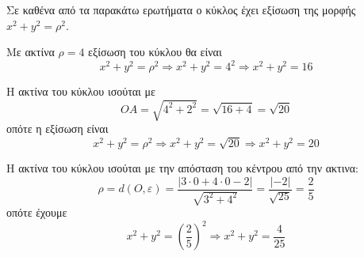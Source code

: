 Σε καθένα από τα παρακάτω ερωτήματα ο κύκλος έχει εξίσωση της μορφής $ x^2+y^2=\rho^2 $.
\begin{alist}
\item Με ακτίνα $ \rho=4 $ εξίσωση του κύκλου θα είναι
\[ x^2+y^2=\rho^2\Rightarrow x^2+y^2=4^2\Rightarrow x^2+y^2=16 \]
\item Η ακτίνα του κύκλου ισούται με
\[ OA=\sqrt{4^2+2^2}=\sqrt{16+4}=\sqrt{20} \]
οπότε η εξίσωση είναι
\[ x^2+y^2=\rho^2\Rightarrow x^2+y^2=\sqrt{20}\Rightarrow x^2+y^2=20 \]
\item Η ακτίνα του κύκλου ισούται με την απόσταση του κέντρου από την ακτινα:
\[ \rho=d(O,\varepsilon)=\frac{|3\cdot 0+4\cdot 0-2|}{\sqrt{3^2+4^2}}=\frac{|-2|}{\sqrt{25}}=\frac{2}{5} \]
οπότε έχουμε
\[ x^2+y^2=\left(\frac{2}{5}\right)^2\Rightarrow x^2+y^2=\frac{4}{25} \]
\end{alist}
